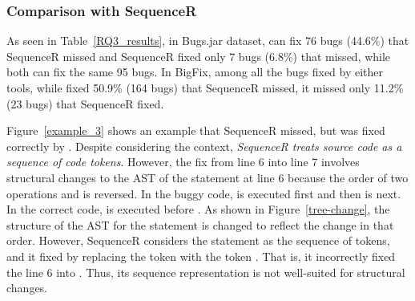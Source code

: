 \subsubsection{\bf Comparison with SequenceR}

As seen in Table~\ref{RQ3_results}, in Bugs\-.jar dataset, {\tool} can
fix 76 bugs (44.6\%) that SequenceR missed and SequenceR fixed only 7
bugs (6.8\%) that {\tool} missed, while both can fix the same 95 bugs.
In BigFix, among all the bugs fixed by either
tools, while {\tool} fixed 50.9\% (164 bugs) that SequenceR missed,
it missed only 11.2\% (23 bugs) that SequenceR fixed.

Figure~\ref{example_3} shows an example that SequenceR missed, but was
fixed correctly by {\tool}. Despite considering the context, {\em
  SequenceR treats source code as a sequence of code tokens}. However,
the fix from line 6 into line 7 involves structural changes to the AST
of the statement at line 6 because the order of two operations
 and \code{\%} is reversed. In the buggy code,  is
executed first and then \code{\%} is next. In the correct code,
\code{\%} is executed before . As shown in
Figure~\ref{tree-change}, the structure of the AST for the statement
is changed to reflect the change in that order. However, SequenceR
considers the statement as the sequence of tokens, and it fixed
by replacing the token  with the token
. That is, it incorrectly fixed the line 6 into
   
\code{\%} . Thus, its sequence representation
is not well-suited for structural changes.


